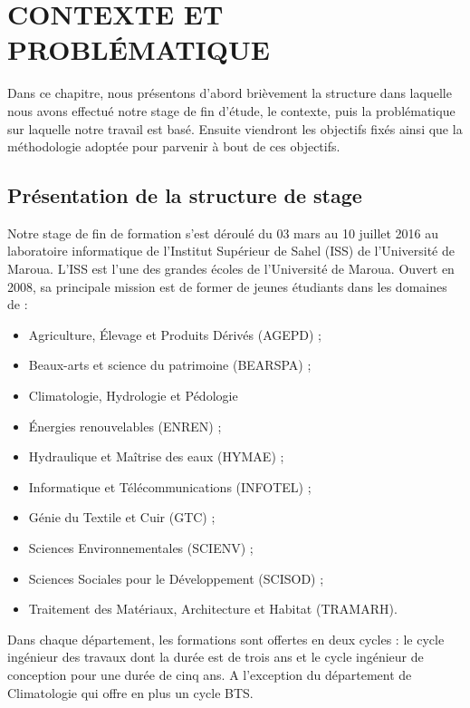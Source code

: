 


 
\chapter{CONTEXTE ET PROBLÉMATIQUE}

\hspace*{10pt} Dans ce chapitre, nous présentons d'abord brièvement la structure dans laquelle
nous avons effectué notre stage de fin d'étude, le contexte, puis la problématique sur laquelle notre travail est basé. Ensuite viendront les objectifs fixés ainsi que la méthodologie adoptée pour parvenir à bout de ces objectifs. 
\section{Présentation de la structure de stage}
Notre stage de fin de formation s'est déroulé du 03 mars au 10 juillet 2016 au laboratoire informatique de l'Institut Supérieur de Sahel (ISS) de l'Université de Maroua. L'ISS est l'une des grandes écoles de l'Université de Maroua. Ouvert en 2008, sa principale mission est de former de jeunes étudiants dans les domaines de :
\begin{itemize}
	\item  [\textbullet] Agriculture, Élevage et Produits Dérivés (AGEPD) ;
	\item  [\textbullet] Beaux-arts et science du patrimoine (BEARSPA) ;
	\item  [\textbullet] Climatologie, Hydrologie et Pédologie 
	\item  [\textbullet] Énergies renouvelables (ENREN) ;
	\item  [\textbullet] Hydraulique et Maîtrise des eaux (HYMAE) ;
	\item  [\textbullet] Informatique et Télécommunications (INFOTEL) ;
	\item  [\textbullet] Génie du Textile et Cuir (GTC) ;
	\item  [\textbullet] Sciences Environnementales (SCIENV) ;
	\item  [\textbullet] Sciences Sociales pour le Développement (SCISOD) ;
	\item  [\textbullet] Traitement des Matériaux, Architecture et Habitat (TRAMARH).
\end{itemize}
Dans chaque département, les formations sont offertes en deux cycles : le cycle ingénieur des travaux dont la durée est de trois ans et le cycle ingénieur de conception pour une durée de cinq ans. A l'exception du département de Climatologie qui offre en plus un cycle BTS.

